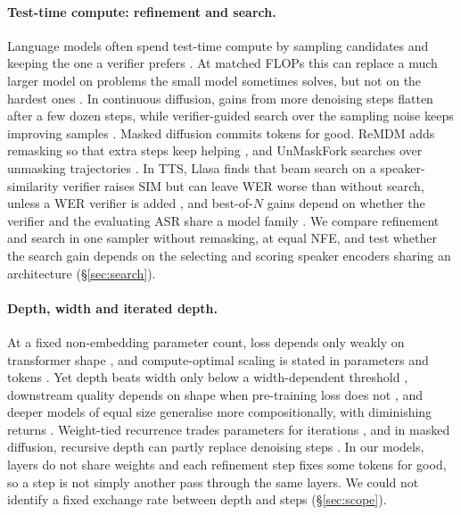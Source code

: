\paragraph{Test-time compute: refinement and search.}
Language models often spend test-time compute by sampling candidates and keeping the one a
verifier prefers \citep{cobbe2021verifiers}. At matched FLOPs this can replace a much larger
model on problems the small model sometimes solves, but not on the hardest ones
\citep{testtime}. In continuous diffusion, gains from more denoising steps flatten after a
few dozen steps, while verifier-guided search over the sampling noise keeps improving samples
\citep{ma2025inference}. Masked diffusion commits tokens for good. ReMDM adds remasking so
that extra steps keep helping \citep{remdm}, and UnMaskFork searches over unmasking
trajectories \citep{misaki2026unmaskfork}. In TTS, Llasa finds that beam search on a
speaker-similarity verifier raises SIM but can leave WER worse than without search, unless a
WER verifier is added \citep{llasa}, and best-of-$N$ gains
depend on whether the verifier and the evaluating ASR share a model family
\citep{yu2026bonconfound}. We compare refinement and search in one sampler without
remasking, at equal NFE, and test whether the search gain depends on the selecting and
scoring speaker encoders sharing an architecture (\S\ref{sec:search}).

\paragraph{Depth, width and iterated depth.}
At a fixed non-embedding parameter count, loss depends only weakly on transformer shape
\citep{kaplan}, and compute-optimal scaling is stated in parameters and tokens
\citep{chinchilla}. Yet depth beats width only below a width-dependent threshold
\citep{levine2020depth}, downstream quality depends on shape when pre-training loss does
not \citep{tay2022scale}, and deeper models of equal size generalise more compositionally,
with diminishing returns \citep{petty2024depth}. Weight-tied recurrence trades parameters for iterations
\citep{dehghani2019universal,saunshi2025looped,geiping2025recurrent}, and in masked diffusion,
recursive depth can partly replace denoising steps \citep{carballo2026recursive}. In our models,
layers do not share weights and each refinement step fixes some tokens for good, so a step is
not simply another pass through the same layers. We could not identify a fixed exchange rate
between depth and steps (\S\ref{sec:scope}).
